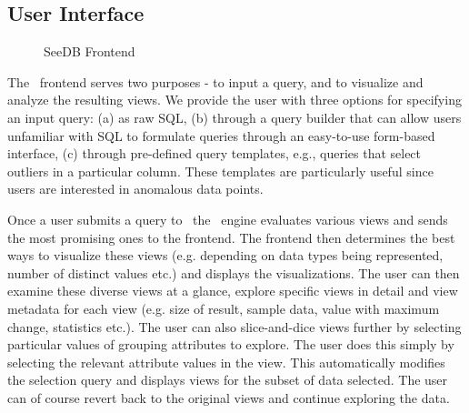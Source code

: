 \subsection{User Interface}
\label{user_interface}

\begin{figure}[htb]
\centerline{
\hbox{}}
\caption{SeeDB Frontend}
\label{fig:frontend}
\end{figure} 

The \SeeDB\ frontend serves two purposes - to input a query, and to visualize
and analyze the resulting views. We provide the user with three options for
specifying an input query: (a) as raw SQL, (b) through a query builder that can
allow users unfamiliar with SQL to formulate queries through an easy-to-use
form-based interface, (c) through pre-defined query templates, e.g., queries
that select outliers in a particular column. These templates are particularly
useful since users are interested in anomalous data points.

Once a user submits a query to \SeeDB\, the \SeeDB\ engine evaluates various
views and sends the most promising ones to the frontend. The frontend then
determines the best ways to visualize these views (e.g. depending on data types
being represented, number of distinct values etc.) and displays the
visualizations. The user can then examine these diverse views at a glance,
explore specific views in detail and view metadata for each view (e.g. size of
result, sample data, value with maximum change, statistics etc.). The user can
also slice-and-dice views further by selecting particular values of grouping
attributes to explore. The user does this simply by selecting the relevant
attribute values in the view. This automatically modifies the selection query
and displays views for the subset of data selected. The user can of course
revert back to the original views and continue exploring the data.
